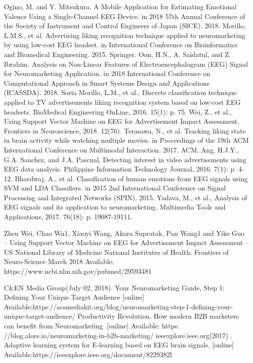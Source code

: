 \documentclass[a4paper, 12pt, oneside]{uet_thesis}
\begin{document}
\begin{thebibliography}{00}
Ogino, M. and Y. Mitsukura. A Mobile Application for Estimating Emotional Valence Using a Single-Channel EEG Device. in 2018 57th Annual Conference of the Society of Instrument and Control Engineers of Japan (SICE). 2018.
Morillo, L.M.S., et al. Advertising liking recognition technique applied to neuromarketing by using low-cost EEG headset. in International Conference on Bioinformatics and Biomedical Engineering. 2015. Springer.
Oon, H.N., A. Saidatul, and Z. Ibrahim. Analysis on Non-Linear Features of Electroencephalogram (EEG) Signal for Neuromarketing Application. in 2018 International Conference on Computational Approach in Smart Systems Design and Applications (ICASSDA). 2018.
Soria Morillo, L.M., et al., Discrete classification technique applied to TV advertisements liking recognition system based on low-cost EEG headsets. BioMedical Engineering OnLine, 2016. 15(1): p. 75.
Wei, Z., et al., Using Support Vector Machine on EEG for Advertisement Impact Assessment. Frontiers in Neuroscience, 2018. 12(76).
Terasawa, N., et al. Tracking liking state in brain activity while watching multiple movies. in Proceedings of the 19th ACM International Conference on Multimodal Interaction. 2017. ACM.
Ang, H.J.Y., G.A. Sanchez, and J.A. Pascual, Detecting interest in video advertisements using EEG data analysis. Philippine Information Technology Journal, 2016. 7(1): p. 4-12.
Bhardwaj, A., et al. Classification of human emotions from EEG signals using SVM and LDA Classifiers. in 2015 2nd International Conference on Signal Processing and Integrated Networks (SPIN). 2015.
Yadava, M., et al., Analysis of EEG signals and its application to neuromarketing. Multimedia Tools and Applications, 2017. 76(18): p. 19087-19111.


Zhen Wei, Chao Wu1, Xiaoyi Wang, Akara Supratak, Pan Wang1 and Yike Guo – Using Support Vector Machine on EEG for Advertisement Impact Assessment – US National Library of Medicine National Institutes of Health: Frontiers of Neuro-Science March 2018  Available: https://www.ncbi.nlm.nih.gov/pubmed/29593481


C\&EN Media Group(July 02, 2018). Your Neuromarketing Guide, Step 1: Defining Your Unique Target Audience   [online] Available:https://acsmediakit.org/blog/neuromarketing-step-1-defining-your-unique-target-audience/
 Productivity Revolution. How modern B2B marketers can benefit from Neuromarketing .[online] Available: https: //blog.alore.io/neuromarketing-in-b2b-marketing/
 ieeexplore.ieee.org(2017) .  Adaptive learning system for E-learning based on EEG brain signals.  [online] Available:https://ieeexplore.ieee.org/document/8229382l


\end{thebibliography}
\end{document}
